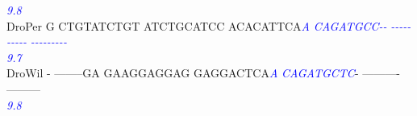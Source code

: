 \documentclass[11pt,twoside,reqno,a4paper]{article}
\begin{document}
{\hspace*{7\charwidth}\hspace*{1\charwidth}\hspace*{1\charwidth}\hspace*{1\charwidth}\hspace*{30\charwidth}\textit{\textcolor{Blue}{9.8}}\hspace*{1\charwidth}\hspace*{1\charwidth}\hspace*{1\charwidth}\\
DroPer	G	CTGTATCTGT	ATCTGCATCC	ACACATTCA\textit{\textcolor{Blue}{A}}	\textit{\textcolor{Blue}{C}}\textit{\textcolor{Blue}{A}}\textit{\textcolor{Blue}{G}}\textit{\textcolor{Blue}{A}}\textit{\textcolor{Blue}{T}}\textit{\textcolor{Blue}{G}}\textit{\textcolor{Blue}{C}}\textit{\textcolor{Blue}{C}}\textit{\textcolor{Blue}{-}}\textit{\textcolor{Blue}{-}}	\textit{\textcolor{Blue}{-}}\textit{\textcolor{Blue}{-}}\textit{\textcolor{Blue}{-}}\textit{\textcolor{Blue}{-}}\textit{\textcolor{Blue}{-}}\textit{\textcolor{Blue}{-}}\textit{\textcolor{Blue}{-}}\textit{\textcolor{Blue}{-}}\textit{\textcolor{Blue}{-}}\textit{\textcolor{Blue}{-}}	\textit{\textcolor{Blue}{-}}\textit{\textcolor{Blue}{-}}\textit{\textcolor{Blue}{-}}\textit{\textcolor{Blue}{-}}\textit{\textcolor{Blue}{-}}\textit{\textcolor{Blue}{-}}\textit{\textcolor{Blue}{-}}\textit{\textcolor{Blue}{-}}\textit{\textcolor{Blue}{-}}\\
\hspace*{7\charwidth}\hspace*{1\charwidth}\hspace*{1\charwidth}\hspace*{1\charwidth}\hspace*{30\charwidth}\textit{\textcolor{Blue}{9.7}}\hspace*{1\charwidth}\hspace*{1\charwidth}\hspace*{1\charwidth}\\
DroWil	-	--------GA	GAAGGAGGAG	GAGGACTCA\textit{\textcolor{Blue}{A}}	\textit{\textcolor{Blue}{C}}\textit{\textcolor{Blue}{A}}\textit{\textcolor{Blue}{G}}\textit{\textcolor{Blue}{A}}\textit{\textcolor{Blue}{T}}\textit{\textcolor{Blue}{G}}\textit{\textcolor{Blue}{C}}\textit{\textcolor{Blue}{T}}\textit{\textcolor{Blue}{C}}-	----------	---------\\
\hspace*{7\charwidth}\hspace*{1\charwidth}\hspace*{1\charwidth}\hspace*{1\charwidth}\hspace*{30\charwidth}\textit{\textcolor{Blue}{9.8}}\hspace*{1\charwidth}\hspace*{1\charwidth}\hspace*{1\charwidth}\\
}
\end{document}
